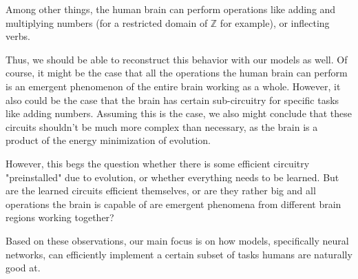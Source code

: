 \documentclass[../../main.tex]{subfiles}
\begin{document}
    \begin{premise}
        Among other things, the human brain can perform operations like adding and multiplying numbers (for a restricted domain of $\mathbb{Z}$ for example), or inflecting verbs.
    \end{premise}

    Thus, we should be able to reconstruct this behavior with our models as well. Of course, it might be the case that all the operations the human brain can perform is an emergent phenomenon of the entire brain working as a whole. However, it also could be the case that the brain has certain sub-circuitry for specific tasks like adding numbers. Assuming this is the case, we also might conclude that these circuits shouldn't be much more complex than necessary, as the brain is a product of the energy minimization of evolution.

    \begin{remark}
        However, this begs the question whether there is some efficient circuitry "preinstalled" due to evolution, or whether everything needs to be learned. But are the learned circuits efficient themselves, or are they rather big and all operations the brain is capable of are emergent phenomena from different brain regions working together?
    \end{remark}

    Based on these observations, our main focus is on how models, specifically neural networks, can efficiently implement a certain subset of tasks humans are naturally good at.
\end{document}
